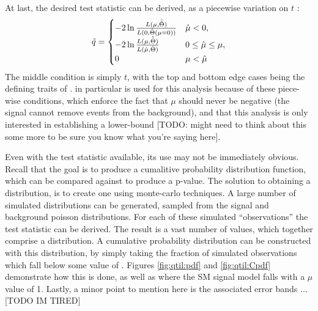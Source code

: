     At last, the desired test statistic \qtil can be derived, as a piecewise variation on $t$ \cite{asymptotic_formulae_for_likelihood}:
    \begin{equation}
        \tilde{q} = \begin{cases}
            -2 \ln{\frac{L(\mu, \hat {\hat \Theta})}{L(0, \hat \Theta(\mu=0))}} & \hat \mu < 0,\\
            -2 \ln{\frac{L(\mu, \hat {\hat \Theta})}{L(\hat \mu, \hat \Theta)}} & 0 \leq \hat \mu \leq \mu,\\
            0 & \mu < \hat \mu 
        \end{cases}
    \end{equation}
    The middle condition is simply $t$, with the top and bottom edge cases being the defining traits of \qtil.
    \qtil in particular is used for this analysis because of these piece-wise conditions,
        which enforce the fact that $\mu$ should never be negative (the signal cannot remove events from the background),
        and that this analysis is only interested in establishing a lower-bound
        [TODO: might need to think about this some more to be sure you know what you're saying here].

    Even with the test statistic \qtil available, its use may not be immediately obvious.
    Recall that the goal is to produce a cumalitive probability distribution function,
        which can be compared against to produce a p-value.
    The solution to obtaining a distribution, is to create one using monte-carlo techniques.
    A large number of simulated distributions can be generated, sampled from the signal and background poisson distributions.
    For each of these simulated ``observations'' the test statistic \qtil can be derived.
    The result is a vast number of \qtil values, which together comprise a distribution.
    A cumulative probability distribution can be constructed with this distribution,
        by simply taking the fraction of simulated observations which fall below some value of \qtil.
    Figures \ref{fig:qtil:pdf} and \ref{fig:qtil:Cpdf} demonstrate how this is done,
        as well as where the SM signal model falls with a $\mu$ value of 1.
    Lastly, a minor point to mention here is the associated error bands ... [TODO IM TIRED]

